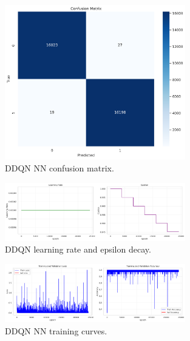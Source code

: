 \documentclass[16pt]{report}
\begin{document}
\begin{figure}[htbp]
    \centering
    \includegraphics[width=0.7\textwidth]{images/dqn_cnn_confusion_matrix.png}
    \caption{DDQN NN confusion matrix.}
    \label{fig:ddqn_confusion}
\end{figure}

\vspace{0.5cm}

\begin{figure}[htbp]
    \centering
    \includegraphics[width=0.7\textwidth]{images/dqn_cnn_lr_epsilon.png}
    \caption{DDQN learning rate and epsilon decay.}
    \label{fig:ddqn_lr_epsilon}
\end{figure}

\vspace{0.5cm}

\begin{figure}[htbp]
    \centering
    \includegraphics[width=0.7\textwidth]{images/dqn_cnn_training_curves.png}
    \caption{DDQN NN training curves.}
    \label{fig:ddqn_training_curves}
\end{figure}
\end{document}
